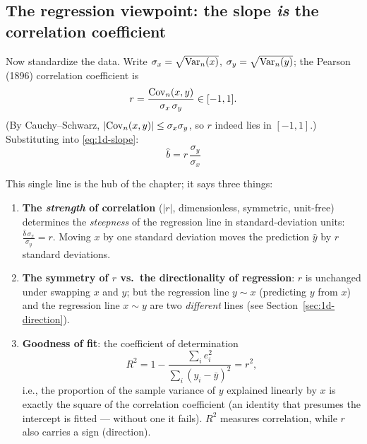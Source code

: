 \subsection{The regression viewpoint: the slope \emph{is} the correlation coefficient}\label{sec:1d-corr}

Now standardize the data. Write $\sigma_x = \sqrt{\mathrm{Var}_n(x)}$, $\sigma_y = \sqrt{\mathrm{Var}_n(y)}$; the Pearson (1896) correlation coefficient\cite{pearson1896} is
\begin{equation}\label{eq:rho}
  r = \frac{\mathrm{Cov}_n(x, y)}{\sigma_x \, \sigma_y} \in [-1, 1].
\end{equation}
(By Cauchy--Schwarz, $|\mathrm{Cov}_n(x,y)| \le \sigma_x \sigma_y$, so $r$ indeed lies in $[-1,1]$.) Substituting into \eqref{eq:1d-slope}:
\begin{equation}\label{eq:slope-rho}
  \boxed{\;\hat{b} = r \, \frac{\sigma_y}{\sigma_x}\;}
\end{equation}

This single line is the hub of the chapter; it says three things:

\begin{enumerate}[label=(\arabic*)]
  \item \textbf{The \textit{strength} of correlation} ($|r|$, dimensionless, symmetric, unit-free) determines the \textit{steepness} of the regression line in standard-deviation units: $\frac{\hat{b}\, \sigma_x}{\sigma_y} = r$. Moving $x$ by one standard deviation moves the prediction $\hat{y}$ by $r$ standard deviations.
  \item \textbf{The symmetry of $r$ vs.\ the directionality of regression}: $r$ is unchanged under swapping $x$ and $y$; but the regression line $y \sim x$ (predicting $y$ from $x$) and the regression line $x \sim y$ are two \textit{different} lines (see Section~\ref{sec:1d-direction}).
  \item \textbf{Goodness of fit}: the coefficient of determination
  \begin{equation}\label{eq:r2-rho2}
    R^2 = 1 - \frac{\sum_i e_i^2}{\sum_i (y_i - \bar{y})^2} = r^2,
  \end{equation}
  i.e., the proportion of the sample variance of $y$ explained linearly by $x$ is exactly the square of the correlation coefficient (an identity that presumes the intercept is fitted --- without one it fails). $R^2$ measures correlation, while $r$ also carries a sign (direction).
\end{enumerate}

